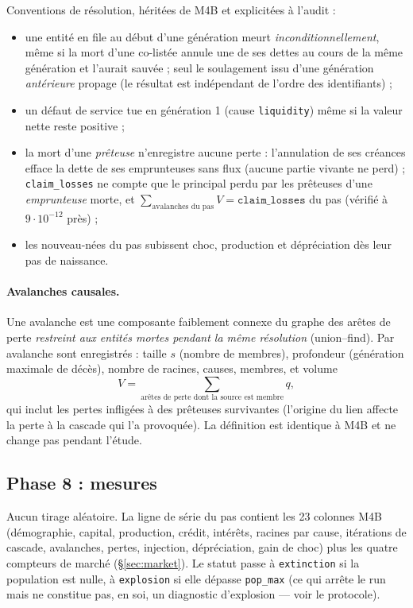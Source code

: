 \documentclass[11pt,a4paper]{article}
\newcommand{\code}[1]{\texttt{#1}}
\begin{document}
Conventions de résolution, héritées de M4B et explicitées à l'audit :
\begin{itemize}
\item une entité en file au début d'une génération meurt
\emph{inconditionnellement}, même si la mort d'une co-listée annule une
de ses dettes au cours de la même génération et l'aurait sauvée ; seul le
soulagement issu d'une génération \emph{antérieure} propage (le résultat
est indépendant de l'ordre des identifiants) ;
\item un défaut de service tue en génération 1 (cause \code{liquidity})
même si la valeur nette reste positive ;
\item la mort d'une \emph{prêteuse} n'enregistre aucune perte :
l'annulation de ses créances efface la dette de ses emprunteuses sans
flux (aucune partie vivante ne perd) ; \code{claim\_losses} ne compte que
le principal perdu par les prêteuses d'une \emph{emprunteuse} morte, et
$\sum_{\text{avalanches du pas}}V=\code{claim\_losses}$ du pas (vérifié à
$9{\cdot}10^{-12}$ près) ;
\item les nouveau-nées du pas subissent choc, production et dépréciation
dès leur pas de naissance.
\end{itemize}

\paragraph{Avalanches causales.}
Une avalanche est une composante faiblement connexe du graphe des arêtes de
perte \emph{restreint aux entités mortes pendant la même résolution}
(union--find). Par avalanche sont enregistrés : taille $s$ (nombre de
membres), profondeur (génération maximale de décès), nombre de racines,
causes, membres, et volume
\begin{equation}
V=\sum_{\text{arêtes de perte dont la source est membre}} q ,
\end{equation}
qui inclut les pertes infligées à des prêteuses survivantes (l'origine du
lien affecte la perte à la cascade qui l'a provoquée). La définition est
identique à M4B et ne change pas pendant l'étude.

\subsection{Phase 8 : mesures}

Aucun tirage aléatoire. La ligne de série du pas contient les 23 colonnes
M4B (démographie, capital, production, crédit, intérêts, racines par
cause, itérations de cascade, avalanches, pertes, injection, dépréciation,
gain de choc) plus les quatre compteurs de marché
(§\ref{sec:market}). Le statut passe à \code{extinction} si la population
est nulle, à \code{explosion} si elle dépasse \code{pop\_max} (ce qui
arrête le run mais ne constitue pas, en soi, un diagnostic d'explosion —
voir le protocole).
\end{document}
